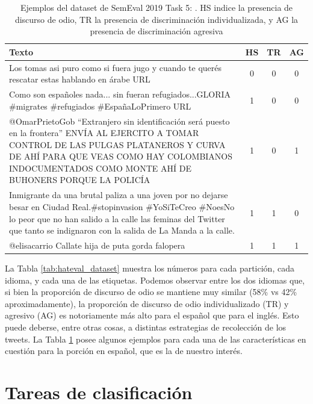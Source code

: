 \begin{table}
    \centering
    \small
    \begin{tabularx}{\textwidth}{X c c c}
        Texto & HS & TR & AG \\
        \hline
        Los tomas asi puro como si fuera jugo y cuando te querés rescatar estas hablando en árabe URL & 0 & 0 & 0 \\
        \rule{0pt}{4ex}Como son españoles nada... sin fueran refugiados...GLORIA \#migrates \#refugiados \#EspañaLoPrimero URL & 1 & 0 & 0 \\
        \rule{0pt}{4ex}@OmarPrietoGob ``Extranjero sin identificación será puesto en la frontera'' ENVÍA AL EJERCITO A TOMAR CONTROL DE LAS PULGAS PLATANEROS Y CURVA DE AHÍ PARA QUE VEAS COMO HAY COLOMBIANOS INDOCUMENTADOS COMO MONTE AHÍ DE BUHONERS PORQUE LA POLICÍA & 1 & 0 & 1 \\
        \rule{0pt}{4ex}Inmigrante da una brutal paliza a una joven por no dejarse besar en Ciudad Real.\#stopinvasion \#YoSiTeCreo \#NoesNo lo peor que no han salido a la calle las feminas del Twitter que tanto se indignaron con la salida de La Manda a la calle. & 1 & 1 & 0 \\
        \rule{0pt}{4ex}@elisacarrio Callate hija de puta gorda falopera & 1 & 1 & 1 \\
        \hline
    \end{tabularx}
    \caption{Ejemplos del dataset de SemEval 2019 Task 5: \hateval{}. HS indice la presencia de discurso de odio, TR la presencia de discriminación individualizada, y AG la presencia de discriminación agresiva}
    \label{tab:hateval_dataset_examples}
\end{table}



La Tabla \ref{tab:hateval_dataset} muestra los números para cada partición, cada idioma, y cada una de las etiquetas. Podemos observar entre los dos idiomas que, si bien la proporción de discurso de odio se mantiene muy similar (58\% vs 42\% aproximadamente), la proporción de discurso de odio individualizado (TR) y agresivo (AG) es notoriamente más alto para el español que para el inglés. Esto puede deberse, entre otras cosas, a distintas estrategias de recolección de los tweets. La Tabla \ref{tab:hateval_dataset_examples} posee algunos ejemplos para cada una de las características en cuestión para la porción en español, que es la de nuestro interés.

\section{Tareas de clasificación}

